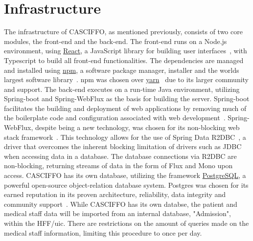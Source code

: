 \section{Infrastructure}
\label{sec:infrastructure}
The infrastructure of CASCIFFO, as mentioned previously, consists of two core modules, the front-end and the back-end.  
The front-end runs on a Node.js environment, using \href{https://reactjs.org/}{React}, a JavaScript library for building user interfaces~\cite{reactjs},  with Typescript to build all front-end functionalities. The dependencies are managed and installed using \href{https://docs.npmjs.com/about-npm}{npm}, a software package manager, installer and the worlds largest software library~\cite{npm}. npm was chosen over \href{https://yarnpkg.com/}{yarn}~\cite{yarn} due to its larger community and support.
The back-end executes on a run-time Java environment, utilizing Spring-boot and Spring-WebFlux as the basis for building the server. Spring-boot facilitates the building and deployment of web applications by removing much of the boilerplate code and configuration associated with web development~\cite{spring-boot}. Spring-WebFlux, despite being a new technology, was chosen for its non-blocking web stack framework~\cite{spring-webflux}. This technology allows for the use of Spring Data R2DBC~\cite{r2dbc}, a driver that overcomes the inherent blocking limitation of drivers such as JDBC when accessing data in a database. The database connections via R2DBC are non-blocking, returning streams of data in the form of Flux and Mono upon access.
CASCIFFO has its own database, utilizing the framework \href{https://www.postgresql.org/about/}{PostgreSQL}, a powerful open-source object-relation database system. Postgres was chosen for its earned reputation in its proven architecture, reliability, data integrity and community support~\cite{postgresql}. While CASCIFFO has its own databse, the patient and medical staff data will be imported from an internal database, "Admission", within the HFF/\acrshort{uic}. There are restrictions on the amount of queries made on the medical staff information, limiting this procedure to once per day.

